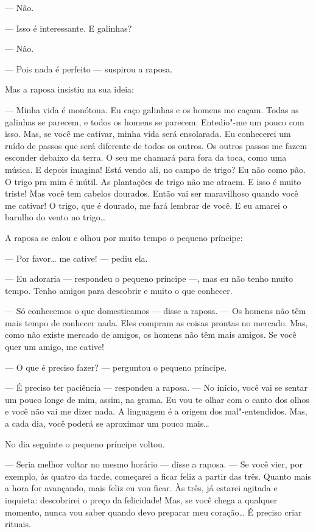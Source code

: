 \begin{Parallel}[p]{}{}
{--- Não.

--- Isso é interessante. E galinhas?

--- Não.

--- Pois nada é perfeito --- suspirou a raposa.

Mas a raposa insistiu na sua ideia:

--- Minha vida é monótona. Eu caço galinhas e os homens me caçam. Todas as
galinhas se parecem, e todos os homens se parecem. Entedio"-me um pouco
com isso. Mas, se você me cativar, minha vida será ensolarada. Eu
conhecerei um ruído de passos que será diferente de todos os outros. Os
outros passos me fazem esconder debaixo da terra. O seu me chamará para
fora da toca, como uma música. E depois imagina! Está vendo ali, no
campo de trigo? Eu não como pão. O trigo pra mim é inútil. As plantações
de trigo não me atraem. E isso é muito triste! Mas você tem cabelos
dourados. Então vai ser maravilhoso quando você me cativar! O trigo, que
é dourado, me fará lembrar de você. E eu amarei o barulho do vento no
trigo\ldots{}

A raposa se calou e olhou por muito tempo o pequeno príncipe:

--- Por favor\ldots{} me cative! --- pediu ela.

--- Eu adoraria --- respondeu o pequeno príncipe ---, mas eu não tenho muito
tempo. Tenho amigos para descobrir e muito o que conhecer.

--- Só conhecemos o que domesticamos --- disse a raposa. --- Os homens não
têm mais tempo de conhecer nada. Eles compram as coisas prontas no
mercado. Mas, como não existe mercado de amigos, os homens não têm mais
amigos. Se você quer um amigo, me cative!

--- O que é preciso fazer? --- perguntou o pequeno príncipe.

--- É preciso ter paciência --- respondeu a raposa. --- No início, você vai
se sentar um pouco longe de mim, assim, na grama. Eu vou te olhar com o
canto dos olhos e você não vai me dizer nada. A linguagem é a origem dos
mal"-entendidos. Mas, a cada dia, você poderá se aproximar um pouco
mais\ldots{}

No dia seguinte o pequeno príncipe voltou.

--- Seria melhor voltar no mesmo horário --- disse a raposa. --- Se você
vier, por exemplo, às quatro da tarde, começarei a ficar feliz a partir
das três. Quanto mais a hora for avançando, mais feliz eu vou ficar. Às
três, já estarei agitada e inquieta: descobrirei o preço da felicidade!
Mas, se você chega a qualquer momento, nunca vou saber quando devo
preparar meu coração\ldots{} É preciso criar rituais.

}
\end{Parallel}
